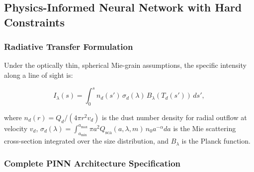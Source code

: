 \documentclass[usenatbib]{mnras}
\begin{document}
\subsection{Physics-Informed Neural Network with Hard Constraints}\label{sec:pinn}

\subsubsection{Radiative Transfer Formulation}

Under the optically thin, spherical Mie-grain assumptions, the specific intensity along a line of sight is:

\begin{equation}\label{eq:thin_dust}
I_\lambda(s) = \int_{0}^{s} n_d(s') \, \sigma_d(\lambda) \, B_\lambda(T_d(s')) \, ds',
\end{equation}

where $n_d(r) = Q_d / (4\pi r^2 v_d)$ is the dust number density for radial outflow at velocity $v_d$, $\sigma_d(\lambda) = \int_{a_{\min}}^{a_{\max}} \pi a^2 Q_{\text{sca}}(a,\lambda,m) \, n_0 a^{-\alpha} da$ is the Mie scattering cross-section integrated over the size distribution, and $B_\lambda$ is the Planck function.

\subsubsection{Complete PINN Architecture Specification}\label{sec:arch}
\end{document}
